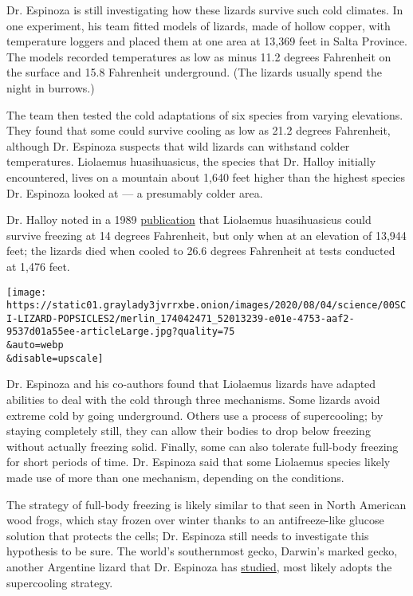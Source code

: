Dr. Espinoza is still investigating how these lizards survive such cold
climates. In one experiment, his team fitted models of lizards, made of
hollow copper, with temperature loggers and placed them at one area at
13,369 feet in Salta Province. The models recorded temperatures as low
as minus 11.2 degrees Fahrenheit on the surface and 15.8 Fahrenheit
underground. (The lizards usually spend the night in burrows.)

The team then tested the cold adaptations of six species from varying
elevations. They found that some could survive cooling as low as 21.2
degrees Fahrenheit, although Dr. Espinoza suspects that wild lizards can
withstand colder temperatures. Liolaemus huasihuasicus, the species that
Dr. Halloy initially encountered, lives on a mountain about 1,640 feet
higher than the highest species Dr. Espinoza looked at --- a presumably
colder area.

Dr. Halloy noted in a 1989
\href{https://scholarspace.manoa.hawaii.edu/bitstream/10125/1214/v43n2-170-184.pdf}{publication}
that Liolaemus huasihuasicus could survive freezing at 14 degrees
Fahrenheit, but only when at an elevation of 13,944 feet; the lizards
died when cooled to 26.6 degrees Fahrenheit at tests conducted at 1,476
feet.

\texttt{[image: https://static01.graylady3jvrrxbe.onion/images/2020/08/04/science/00SCI-LIZARD-POPSICLES2/merlin\_174042471\_52013239-e01e-4753-aaf2-9537d01a55ee-articleLarge.jpg?quality=75\\\&auto=webp\\\&disable=upscale]}

Dr. Espinoza and his co-authors found that Liolaemus lizards have
adapted abilities to deal with the cold through three mechanisms. Some
lizards avoid extreme cold by going underground. Others use a process of
supercooling; by staying completely still, they can allow their bodies
to drop below freezing without actually freezing solid. Finally, some
can also tolerate full-body freezing for short periods of time. Dr.
Espinoza said that some Liolaemus species likely made use of more than
one mechanism, depending on the conditions.

The strategy of full-body freezing is likely similar to that seen in
North American wood frogs, which stay frozen over winter thanks to an
antifreeze-like glucose solution that protects the cells; Dr. Espinoza
still needs to investigate this hypothesis to be sure. The world's
southernmost gecko, Darwin's marked gecko, another Argentine lizard that
Dr. Espinoza has
\href{https://www.sciencedirect.com/science/article/abs/pii/S030645651300020X}{studied},
most likely adopts the supercooling strategy.

